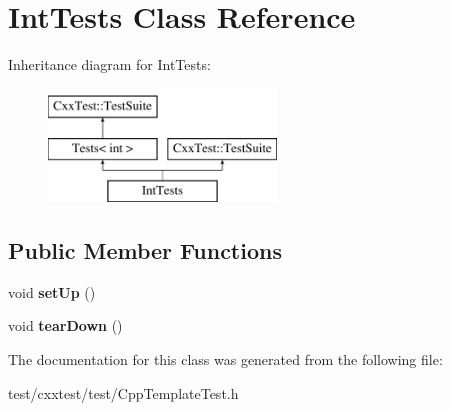 \hypertarget{classIntTests}{\section{Int\-Tests Class Reference}
\label{classIntTests}
}
Inheritance diagram for Int\-Tests\-:\begin{figure}[H]
\begin{center}
\leavevmode
\includegraphics[height=3.000000cm]{classIntTests}
\end{center}
\end{figure}
\subsection*{Public Member Functions}
\begin{DoxyCompactItemize}
\item 
\hypertarget{classIntTests_a1968631110044443ad4bf78fe0d97ea0}{void {\bfseries set\-Up} ()}\label{classIntTests_a1968631110044443ad4bf78fe0d97ea0}

\item 
\hypertarget{classIntTests_a855f1ddf4fa633e85c7b1a0724358832}{void {\bfseries tear\-Down} ()}\label{classIntTests_a855f1ddf4fa633e85c7b1a0724358832}

\end{DoxyCompactItemize}


The documentation for this class was generated from the following file\-:\begin{DoxyCompactItemize}
\item 
test/cxxtest/test/Cpp\-Template\-Test.\-h\end{DoxyCompactItemize}
